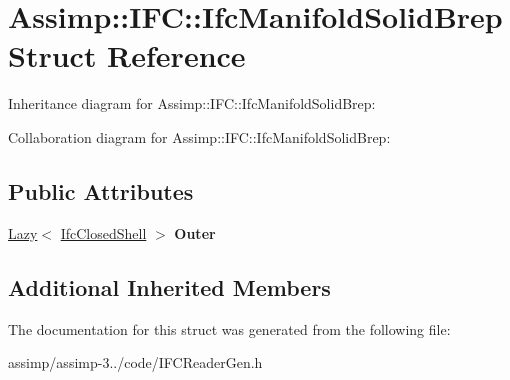 \hypertarget{struct_assimp_1_1_i_f_c_1_1_ifc_manifold_solid_brep}{\section{Assimp\+:\+:I\+F\+C\+:\+:Ifc\+Manifold\+Solid\+Brep Struct Reference}
\label{struct_assimp_1_1_i_f_c_1_1_ifc_manifold_solid_brep}
}


Inheritance diagram for Assimp\+:\+:I\+F\+C\+:\+:Ifc\+Manifold\+Solid\+Brep\+:


Collaboration diagram for Assimp\+:\+:I\+F\+C\+:\+:Ifc\+Manifold\+Solid\+Brep\+:
\subsection*{Public Attributes}
\begin{DoxyCompactItemize}
\item 
\hypertarget{struct_assimp_1_1_i_f_c_1_1_ifc_manifold_solid_brep_aee0ccabdd9b3c31812241d145e4519a3}{\hyperlink{struct_assimp_1_1_s_t_e_p_1_1_lazy}{Lazy}$<$ \hyperlink{struct_assimp_1_1_i_f_c_1_1_ifc_closed_shell}{Ifc\+Closed\+Shell} $>$ {\bfseries Outer}}\label{struct_assimp_1_1_i_f_c_1_1_ifc_manifold_solid_brep_aee0ccabdd9b3c31812241d145e4519a3}

\end{DoxyCompactItemize}
\subsection*{Additional Inherited Members}


The documentation for this struct was generated from the following file\+:\begin{DoxyCompactItemize}
\item 
assimp/assimp-\/3../code/I\+F\+C\+Reader\+Gen.\+h\end{DoxyCompactItemize}
